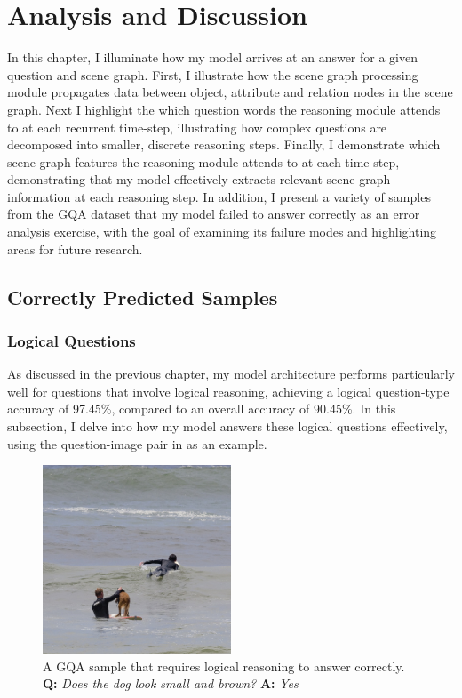 \chapter{Analysis and Discussion}
\label{chapter:discussion}

In this chapter, I illuminate how my model arrives at an answer for a given question and scene graph. First, I illustrate how the scene graph processing module propagates data between object, attribute and relation nodes in the scene graph. Next I highlight the which question words the reasoning module attends to at each recurrent time-step, illustrating how complex questions are decomposed into smaller, discrete reasoning steps. Finally, I demonstrate which scene graph features the reasoning module attends to at each time-step, demonstrating that my model effectively extracts relevant scene graph information at each reasoning step. In addition, I present a variety of samples from the GQA dataset that my model failed to answer correctly as an error analysis exercise, with the goal of examining its failure modes and highlighting areas for future research.

\section{Correctly Predicted Samples}

\subsection{Logical Questions}

As discussed in the previous chapter, my model architecture performs particularly well for questions that involve logical reasoning, achieving a logical question-type accuracy of 97.45\%, compared to an overall accuracy of 90.45\%. In this subsection, I delve into how my model answers these logical questions effectively, using the question-image pair in \figureautorefname{ \ref{fig:positive_logical_sample}} as an example.

\begin{figure}[htbp]
    \centering
    \includegraphics[width=0.5\textwidth]{figures/positive_logical/positive_logical.png}
    \caption[A GQA sample that requires logical reasoning to answer correctly.]{A GQA sample that requires logical reasoning to answer correctly.\\\textbf{Q:} \textit{Does the dog look small and brown?} \textbf{A:} \textit{Yes}}
    \label{fig:positive_logical_sample}
\end{figure}


